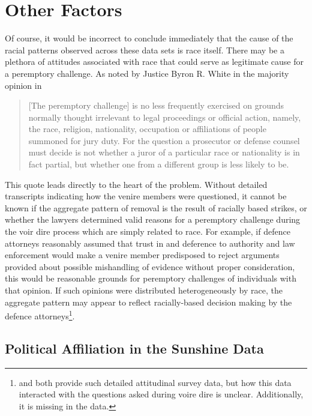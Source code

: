 \section{Other Factors} \label{sec:otherfact}

Of course, it would be incorrect to conclude immediately that the cause of the racial patterns observed across these data sets is
race itself. There may be a plethora of attitudes associated with race that could serve as legitimate cause for a peremptory
challenge. As noted by Justice Byron R. White in the majority opinion in \cite{swainvalabama}

\begin{quote}
  [The peremptory challenge] is no less frequently exercised on grounds normally thought irrelevant to legal proceedings or
  official action, namely, the race, religion, nationality, occupation or affiliations of people summoned for jury duty. For the
  question a prosecutor or defense counsel must decide is not whether a juror of a particular race or nationality is in fact
  partial, but whether one from a different group is less likely to be.
\end{quote}

This quote leads directly to the heart of the problem. Without detailed transcripts indicating how the venire members were
questioned, it cannot be known if the aggregate pattern of removal is the result of racially based strikes, or whether the lawyers
determined valid reasons for a peremptory challenge during the voir dire process which are simply related to race. For example, if
defence attorneys reasonably assumed that trust in and deference to authority and law enforcement would make a venire member
predisposed to reject arguments provided about possible mishandling of evidence without proper consideration, this would be
reasonable grounds for peremptory challenges of individuals with that opinion. If such opinions were distributed heterogeneously
by race, the aggregate pattern may appear to reflect racially-based decision making by the defence
attorneys\footnote{\cite{StubbornLegacy} and \cite{PerempChalMurder} both provide such detailed attitudinal survey data, but how
  this data interacted with the questions asked during voire dire is unclear. Additionally, it is missing in the
  \cite{JurySunshineProj} data.}. 

\subsection{Political Affiliation in the Sunshine Data} \label{sec:polaff}

